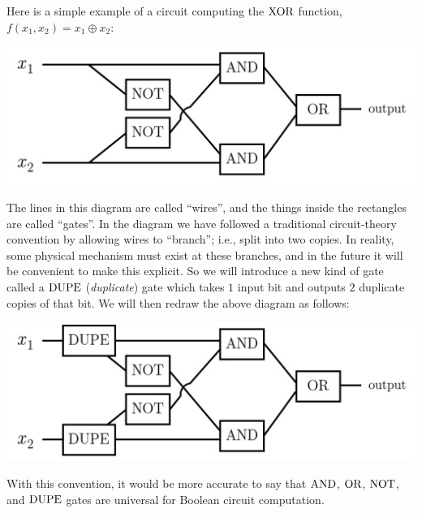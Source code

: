 \documentclass[12pt]{article}
\begin{document}
Here is a simple example of a circuit computing the $\XOR$ function, $f(x_1, x_2) = x_1 \oplus x_2$:
\begin{center}
        \includegraphics[scale=.5]{lecture01-figure1.png}
\end{center}
The lines in this diagram are called ``wires'', and the things inside the rectangles are called ``gates''.  In the diagram we have followed a traditional circuit-theory convention by allowing wires to ``branch''; i.e., split into two copies.  In reality, some physical mechanism must exist at these branches, and in the future it will be convenient to make this explicit.  So we will introduce a new kind of gate called a $\DUPE$ (\emph{duplicate}) gate which takes $1$ input bit and outputs $2$ duplicate copies of that bit.  We will then redraw the above diagram as follows:
\begin{center}
        \includegraphics[scale=.5]{lecture01-figure2.png}
\end{center}
With this convention, it would be more accurate to say that $\AND$, $\OR$, $\NOT$, and $\DUPE$ gates are universal for Boolean circuit computation.
\end{document}
